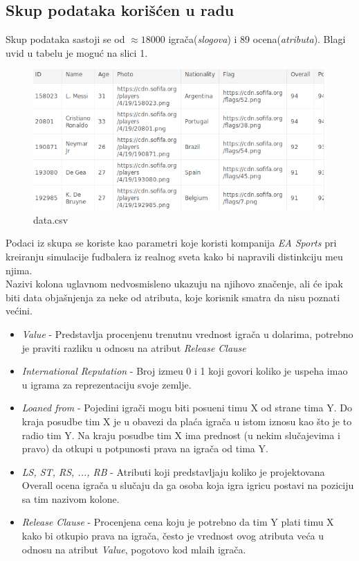 \documentclass[a4paper, 11pt]{article}
\begin{document}
\subsection{Skup podataka kori\v{s}\'{c}en u radu}
Skup podataka sastoji se od $\approx 18000$ igra\v{c}a(\emph{slogova}) i 89 ocena(\emph{atributa}).
Blagi uvid u tabelu je mogu\'{c} na slici 1. 
\begin{figure}[h]
\graphicspath{{../}}
\includegraphics[scale=0.45]{head.png}
\caption{data.csv}
\label{data}
\end{figure}

Podaci iz skupa se koriste kao parametri koje koristi kompanija \emph{EA Sports}
pri kreiranju simulacije fudbalera iz realnog sveta kako bi napravili
distinkciju me\dj{}u njima.
\\
Nazivi kolona uglavnom nedvosmisleno ukazuju na njihovo zna\v{c}enje, ali \'{c}e 
ipak biti data obja\v{s}njenja za neke od atributa, koje korisnik smatra da nisu
poznati ve\'{c}ini.
\begin{itemize}

\item \emph{Value} - Predstavlja procenjenu trenutnu vrednost igra\v{c}a u dolarima, potrebno je praviti
razliku u odnosu na atribut \emph{Release Clause}

\item \emph{International Reputation} - Broj izme\dj{}u 0 i 1 koji govori koliko je uspeha imao u igrama za 
reprezentaciju svoje zemlje.

\item \emph{Loaned from} - Pojedini igra\v{c}i mogu biti posu\dj{}eni timu X od strane tima Y. Do kraja
posudbe tim X je u obavezi da pla\'{c}a igra\v{c}a u istom iznosu kao \v{s}to je to radio
tim Y. Na kraju posudbe tim X ima prednost (u nekim slu\v{c}ajevima i pravo) da otkupi u potpunosti
prava na igra\v{c}a od tima Y.

\item \emph{LS, ST, RS, ..., RB} - Atributi koji predstavljaju koliko je projektovana Overall ocena
igra\v{c}a u slu\v{c}aju da ga osoba koja igra igricu postavi na poziciju sa tim nazivom kolone.

\item \emph{Release Clause} - Procenjena cena koju je potrebno da tim Y plati timu X kako bi otkupio prava
na igra\v{c}a, \v{c}esto je vrednost ovog atributa ve\'{c}a u odnosu na atribut \emph{Value}, pogotovo kod
mla\dj{}ih igra\v{c}a.
\end{itemize}
\end{document}
